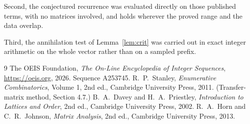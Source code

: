 \documentclass[11pt,a4paper]{article}
\theoremstyle{plain}
\theoremstyle{definition}
\begin{document}
Second, the conjectured recurrence was evaluated directly on those published terms, with no
matrices involved, and holds wherever the proved range and the data overlap.

Third, the annihilation test of Lemma~\ref{lem:crit} was carried out in exact integer
arithmetic on the whole vector rather than on a sampled prefix.

\begin{thebibliography}{9}
 The OEIS Foundation, \emph{The On-Line Encyclopedia of Integer
Sequences}, \url{https://oeis.org}, 2026. Sequence A253745.
 R.~P.~Stanley, \emph{Enumerative Combinatorics}, Volume 1, 2nd ed.,
Cambridge University Press, 2011. (Transfer-matrix method, Section 4.7.)
 B.~A.~Davey and H.~A.~Priestley, \emph{Introduction to Lattices and
Order}, 2nd ed., Cambridge University Press, 2002.
 R.~A.~Horn and C.~R.~Johnson, \emph{Matrix Analysis}, 2nd ed., Cambridge
University Press, 2013.
\end{thebibliography}
\end{document}
